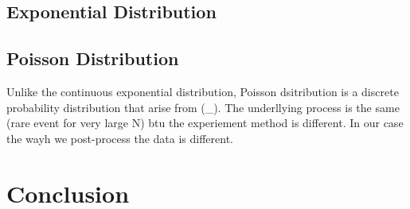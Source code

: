 \documentclass{article}
\begin{document}
 	\subsection{Exponential Distribution}
 	\subsection{Poisson Distribution}
 	Unlike the continuous exponential distribution, Poisson dsitribution is a discrete probability distribution that arise from (\_). The underllying process is the same (rare event for very large N) btu the experiement method is different. In our case the wayh we post-process the data is different.
\section{Conclusion\label{end}}
\end{document}

